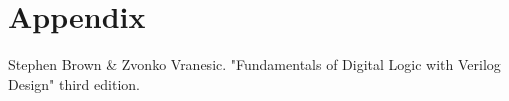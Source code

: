 \documentclass[11pt, spanish]{report}
\begin{document}

\tableofcontents
 
\newpage

\listoffigures
{} 


\listoftables 
{} 
\newpage



\newpage

\clearpage

\clearpage
\section*{Appendix}


\begin{thebibliography}{}
 Stephen Brown & Zvonko Vranesic. "Fundamentals of Digital Logic with Verilog Design" third edition.
 \end{thebibliography} 
 
\end{document}
